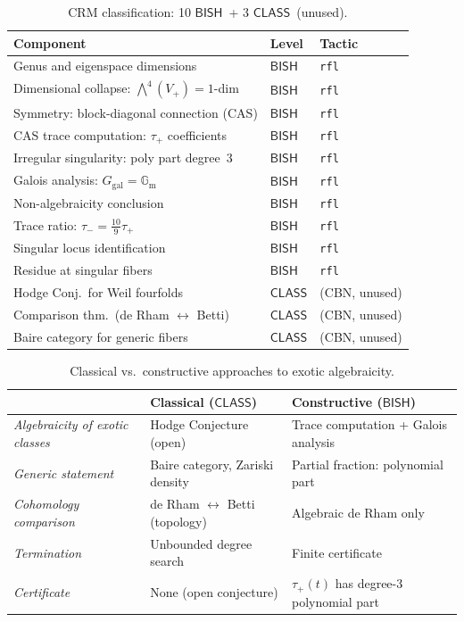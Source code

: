 \documentclass[11pt]{article}
\theoremstyle{plain}
\theoremstyle{definition}
\theoremstyle{remark}
\newcommand{\Ggal}{G_{\mathrm{gal}}}
\newcommand{\Gm}{\mathbb{G}_{\mathrm{m}}}
\newcommand{\BISH}{\ensuremath{\mathsf{BISH}}}
\newcommand{\CLASS}{\ensuremath{\mathsf{CLASS}}}
\begin{document}
\begin{table}[h]
\centering
\small
\begin{tabular}{@{}lll@{}}
\toprule
\textbf{Component} & \textbf{Level} & \textbf{Tactic} \\
\midrule
Genus and eigenspace dimensions & \BISH & \texttt{rfl} \\
Dimensional collapse: $\bigwedge^4(V_+) = 1$-dim & \BISH & \texttt{rfl} \\
Symmetry: block-diagonal connection (CAS) & \BISH & \texttt{rfl} \\
CAS trace computation: $\tau_+$ coefficients & \BISH & \texttt{rfl} \\
Irregular singularity: poly part degree~3 & \BISH & \texttt{rfl} \\
Galois analysis: $\Ggal = \Gm$ & \BISH & \texttt{rfl} \\
Non-algebraicity conclusion & \BISH & \texttt{rfl} \\
Trace ratio: $\tau_- = \tfrac{10}{9}\tau_+$ & \BISH & \texttt{rfl} \\
Singular locus identification & \BISH & \texttt{rfl} \\
Residue at singular fibers & \BISH & \texttt{rfl} \\
\midrule
Hodge Conj.\ for Weil fourfolds & \CLASS & (CBN, unused) \\
Comparison thm.\ (de Rham $\leftrightarrow$ Betti) & \CLASS & (CBN, unused) \\
Baire category for generic fibers & \CLASS & (CBN, unused) \\
\bottomrule
\end{tabular}
\caption{CRM classification: 10 \BISH\ + 3 \CLASS\ (unused).}
\label{tab:audit}
\end{table}

\begin{table}[h]
\centering
\small
\begin{tabular}{@{}p{}p{}p{}@{}}
\toprule
& \textbf{Classical (\CLASS)} & \textbf{Constructive (\BISH)} \\
\midrule
\emph{Algebraicity of exotic classes} & Hodge Conjecture (open) &
  Trace computation + Galois analysis \\
\emph{Generic statement} & Baire category, Zariski density &
  Partial fraction: polynomial part \\
\emph{Cohomology comparison} & de Rham $\leftrightarrow$ Betti (topology) &
  Algebraic de Rham only \\
\emph{Termination} & Unbounded degree search & Finite certificate \\
\emph{Certificate} & None (open conjecture) &
  $\tau_+(t)$ has degree-3 polynomial part \\
\bottomrule
\end{tabular}
\caption{Classical vs.\ constructive approaches to exotic algebraicity.}
\label{tab:comparison}
\end{table}
\end{document}
